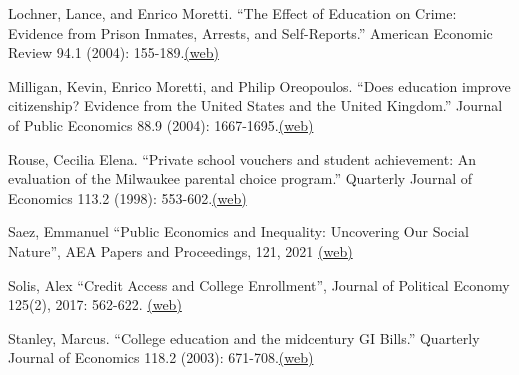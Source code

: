 \documentclass[landscape]{slides}
\begin{document}
\begin{slide}
{Lochner, Lance, and Enrico Moretti. ``The Effect of Education on Crime: Evidence from Prison Inmates, Arrests, and Self-Reports.'' American Economic Review 94.1 (2004): 155-189.\href{http://www.jstor.org/stable/pdfplus/3592774.pdf}{(web)}

Milligan, Kevin, Enrico Moretti, and Philip Oreopoulos. ``Does education improve citizenship? Evidence from the United States and the United Kingdom.'' Journal of Public Economics 88.9 (2004): 1667-1695.\href{http://elsa.berkeley.edu/~saez/course131/Moretti-Mulligan-Oreopoulos03.pdf}{(web)}

Rouse, Cecilia Elena. ``Private school vouchers and student achievement: An evaluation of the Milwaukee parental choice program.'' Quarterly Journal of Economics 113.2 (1998): 553-602.\href{http://elsa.berkeley.edu/~saez/course131/rouse98.pdf}{(web)}

Saez, Emmanuel  ``Public Economics and Inequality: Uncovering Our Social Nature'', AEA Papers and Proceedings, 121, 2021
\href{https://eml.berkeley.edu/~saez/saez-AEAlecture.pdf} {(web)}


Solis, Alex ``Credit Access and College Enrollment'', Journal of Political Economy 125(2), 2017: 562-622.
\href{http://elsa.berkeley.edu/~saez/course131/solis.pdf}{(web)}

Stanley, Marcus. ``College education and the midcentury GI Bills.'' Quarterly Journal of Economics 118.2 (2003): 671-708.\href{http://www.jstor.org/stable/pdfplus/25053917.pdf}{(web)}

}

\end{slide}
\end{document}
